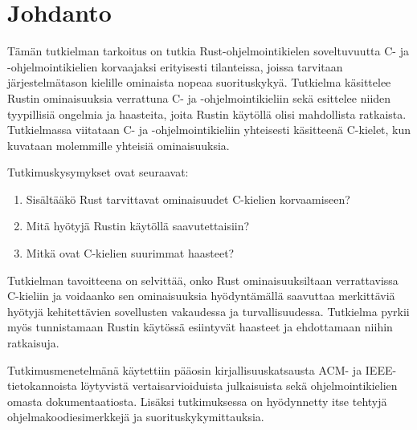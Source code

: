 \chapter{Johdanto} \label{Johdanto}
Tämän tutkielman tarkoitus on tutkia Rust-ohjelmointikielen soveltuvuutta C- ja \Cpp-ohjelmointikielien korvaajaksi erityisesti tilanteissa, joissa tarvitaan järjestelmätason kielille ominaista nopeaa suorituskykyä. Tutkielma käsittelee Rustin ominaisuuksia verrattuna C- ja \Cpp-ohjelmointikieliin sekä esittelee niiden tyypillisiä ongelmia ja haasteita, joita Rustin käytöllä olisi mahdollista ratkaista. Tutkielmassa viitataan C- ja \Cpp-ohjelmointikieliin yhteisesti käsitteenä C-kielet, kun kuvataan molemmille yhteisiä ominaisuuksia.

Tutkimuskysymykset ovat seuraavat:
 \begin{enumerate}
  \item Sisältääkö Rust tarvittavat ominaisuudet C-kielien korvaamiseen?
  \item Mitä hyötyjä Rustin käytöllä saavutettaisiin?
  \item Mitkä ovat C-kielien suurimmat haasteet?
\end{enumerate}

Tutkielman tavoitteena on selvittää, onko Rust ominaisuuksiltaan verrattavissa C-kieliin ja voidaanko sen ominaisuuksia hyödyntämällä saavuttaa merkittäviä hyötyjä kehitettävien sovellusten vakaudessa ja turvallisuudessa. Tutkielma pyrkii myös tunnistamaan Rustin käytössä esiintyvät haasteet ja ehdottamaan niihin ratkaisuja.

Tutkimusmenetelmänä käytettiin pääosin kirjallisuuskatsausta ACM- ja IEEE-tietokannoista löytyvistä vertaisarvioiduista julkaisuista sekä ohjelmointikielien omasta dokumentaatiosta. Lisäksi tutkimuksessa on hyödynnetty itse tehtyjä ohjelmakoodiesimerkkejä ja suorituskykymittauksia.